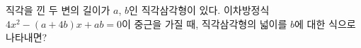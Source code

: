 직각을 낀 두 변의 길이가 $a$, $b$인 직각삼각형이 있다. 이차방정식 $4x^2-(a+4b)x+ab=0$이 중근을 가질 때, 직각삼각형의 넓이를 $b$에 대한 식으로 나타내면?
